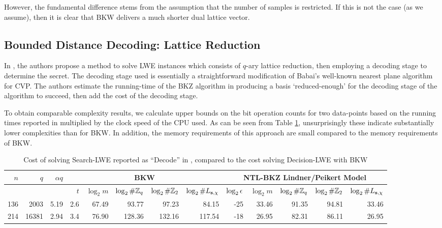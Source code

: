 However, the fundamental difference stems from the assumption that the number of samples is restricted. If this is not the case (as we assume), then it is clear that BKW delivers a much shorter dual lattice vector.

\subsection{Bounded Distance Decoding: Lattice Reduction}
In \cite{LindnerP10}, the authors propose a method to solve LWE instances which consists of $q$-ary lattice reduction, then employing a decoding stage to determine the secret. The decoding stage used is essentially a straightforward modification of Babai's well-known nearest plane algorithm for CVP. The authors estimate the running-time of the BKZ algorithm in producing a basis `reduced-enough' for the decoding stage of the algorithm to succeed, then add the cost of the decoding stage.

To obtain comparable complexity results, we calculate upper bounds on the bit operation counts for two data-points based on the running times reported in \cite{LindnerP10} multiplied by the clock speed of the CPU used. As can be seen from Table \ref{tab:concrete_Lindneretal}, unsurprisingly these indicate substantially lower complexities than for BKW. In addition, the memory requirements of this approach are small compared to the memory requirements of BKW. 

\begin{table}[!htb]
\begin{center}
\begin{tabular}{|r|r|r||r|r|r|r|r||r|r|r|r|r|} 
\hline
$n$ & $q$ & $\alpha q$ & \multicolumn{5}{|c||}{BKW} &  \multicolumn{5}{|c|}{NTL-BKZ Lindner/Peikert Model}\\
\hline
\multicolumn{3}{|c||}{ }  &   $t$   & $\log_2 m$ & $\log_2 \#\mathbb{Z}_q$ & $\log_2 \#\mathbb{Z}_2$ & $\log_2 \#L_{\mathbf{s},\chi}$ & $\log_2 \epsilon$ & $\log_2 m$ & $\log_2 \#\mathbb{Z}_q$ & $\log_2 \#\mathbb{Z}_2$ & $\log_2 \#L_{\mathbf{s},\chi}$\\
\hline
136 &   2003 & 5.19  & 2.6 & 67.49 & 93.77 & 97.23 & 84.15 & -25 & 33.46 & 91.35 & 94.81 & 33.46\\
214 &  16381 & 2.94  & 3.4 & 76.90 & 128.36 & 132.16 & 117.54 & -18 & 26.95 & 82.31 & 86.11 & 26.95\\
\hline
\end{tabular}
\end{center}
\caption{Cost of solving Search-LWE reported as ``Decode'' in \cite{LindnerP10}, compared to the cost solving Decision-LWE with BKW}
\label{tab:concrete_Lindneretal}
\end{table}

